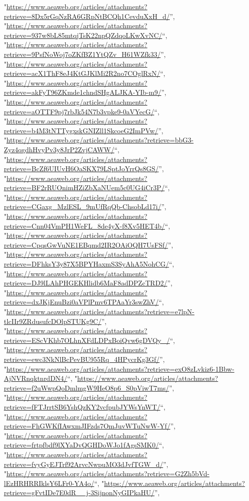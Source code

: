 \documentclass[]{article}
\begin{document}
\begin{itemize}
  "\url{https://www.aeaweb.org/articles/attachments?retrieve=8Dx5rGqNzRA6GRpNtBCQh1CevduXxH_d/}'',
  "\url{https://www.aeaweb.org/articles/attachments?retrieve=937w8bL85mtqjTsK22npQZdqoLKwXvNC/}``,
  "\url{https://www.aeaweb.org/articles/attachments?retrieve=9PsfNoWoj7oZKfBZ1YtQZv_H61WZfk33/}'',
  "\url{https://www.aeaweb.org/articles/attachments?retrieve=acX1ThF8eJ4KtGJKlMi2R2no7COglRxN/}``,
  "\url{https://www.aeaweb.org/articles/attachments?retrieve=akFyT96ZKmde1chndSHgALJKA-YIb-m9/}'',
  "\url{https://www.aeaweb.org/articles/attachments?retrieve=aOTTF9pj7rbJk54N7b3vpke9-0aVYecG/}``,
  "\url{https://www.aeaweb.org/articles/attachments?retrieve=b4M3tNTTygxskGNIZll1SkcoeG2ImPVw/}'',
  "\url{https://www.aeaweb.org/articles/attachments?retrieve=bbG3-Zyz4qgdhHvyPv3y8JrP2ZvjCAWW/}``,
  "\url{https://www.aeaweb.org/articles/attachments?retrieve=BcZf6UIUvH6OaSKX79LSptJoYrrQs8GS/}'',
  "\url{https://www.aeaweb.org/articles/attachments?retrieve=BF2rRUOnimHZiZbXaNUem5c0UG4iCr3P/}``,
  "\url{https://www.aeaweb.org/articles/attachments?retrieve=CGaxg_MzlESL_9mUfRqQb-ChsobLd17i/}'',
  "\url{https://www.aeaweb.org/articles/attachments?retrieve=Cnn04VmPH1WeFL_8de4yX-f8Xv5HET4b/}``,
  "\url{https://www.aeaweb.org/articles/attachments?retrieve=CpqsGwVuNE1EBqmd2IR2OAiOQH7UsFSf/}'',
  "\url{https://www.aeaweb.org/articles/attachments?retrieve=DFhksY3y87X5BPYHaxmS3SyAhA5NohCG/}``,
  "\url{https://www.aeaweb.org/articles/attachments?retrieve=DJ9lLAhPHGEKHlidb6MaF8adDPZcTRD2/}'',
  "\url{https://www.aeaweb.org/articles/attachments?retrieve=dxJKjEnuBzi0aVPlPmv6TPAaYr3swZhV/}``,
  "\url{https://www.aeaweb.org/articles/attachments?retrieve=e7lpN-tlcIIr9ZRdusufcDOlpSTUKg9C/}'',
  "\url{https://www.aeaweb.org/articles/attachments?retrieve=EScVKhb7OLhnXFdLDPxBoiQvw6gDVQy_/}``,
  "\url{https://www.aeaweb.org/articles/attachments?retrieve=ewc3NkNlBcPevBU955Rq_4HPycrKg3Gf/}'',
  "\url{https://www.aeaweb.org/articles/attachments?retrieve=exO8zLvkiz6-1Bbw-AjNVRnqktnrdDN4/}``,
  "\url{https://www.aeaweb.org/articles/attachments?retrieve=f2uWwpQoDmlmgW9HeO8p6_S0pViwT7ms/}'',
  "\url{https://www.aeaweb.org/articles/attachments?retrieve=fFTJrrtSB6YshQzKY2vcfpubJYWsYnWT/}``,
  "\url{https://www.aeaweb.org/articles/attachments?retrieve=FhGWKfIAwxmJIFzds7OmJuvWTuNwW-Yf/}'',
  "\url{https://www.aeaweb.org/articles/attachments?retrieve=frtpfbdf9lXYaDvQGHDoWJo1fAgsSMK0/}``,
  "\url{https://www.aeaweb.org/articles/attachments?retrieve=fvyGyEJTrf92ArvcNwpuMO3dJvfTGW_d/}'',
  "\url{https://www.aeaweb.org/articles/attachments?retrieve=G2Zh5bVd-lEzHRHRRIklsY6LFr0-YA4o/}``,
  "\url{https://www.aeaweb.org/articles/attachments?retrieve=gFvtIDe7E0dR__j-3SijnonNyGIPkaHU/}'',

\end{itemize}
\end{document}
